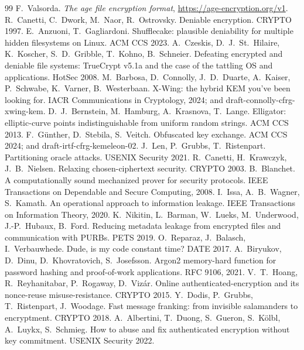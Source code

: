 \documentclass[11pt,a4paper]{article}
\theoremstyle{definition}
\theoremstyle{remark}
\begin{document}
\begin{thebibliography}{99}
 F.~Valsorda. \emph{The age file encryption format}, \url{https://age-encryption.org/v1}.
 R.~Canetti, C.~Dwork, M.~Naor, R.~Ostrovsky. Deniable encryption. CRYPTO 1997.
 E.~Anzuoni, T.~Gagliardoni. Shufflecake: plausible deniability for multiple hidden filesystems on Linux. ACM CCS 2023.
 A.~Czeskis, D.~J.~St.~Hilaire, K.~Koscher, S.~D.~Gribble, T.~Kohno, B.~Schneier. Defeating encrypted and deniable file systems: TrueCrypt v5.1a and the case of the tattling OS and applications. HotSec 2008.
 M.~Barbosa, D.~Connolly, J.~D.~Duarte, A.~Kaiser, P.~Schwabe, K.~Varner, B.~Westerbaan. X-Wing: the hybrid KEM you've been looking for. IACR Communications in Cryptology, 2024; and draft-connolly-cfrg-xwing-kem.
 D.~J.~Bernstein, M.~Hamburg, A.~Krasnova, T.~Lange. Elligator: elliptic-curve points indistinguishable from uniform random strings. ACM CCS 2013.
 F.~G\"unther, D.~Stebila, S.~Veitch. Obfuscated key exchange. ACM CCS 2024; and draft-irtf-cfrg-kemeleon-02.
 J.~Len, P.~Grubbs, T.~Ristenpart. Partitioning oracle attacks. USENIX Security 2021.
 R.~Canetti, H.~Krawczyk, J.~B.~Nielsen. Relaxing chosen-ciphertext security. CRYPTO 2003.
 B.~Blanchet. A computationally sound mechanized prover for security protocols. IEEE Transactions on Dependable and Secure Computing, 2008.
 I.~Issa, A.~B.~Wagner, S.~Kamath. An operational approach to information leakage. IEEE Transactions on Information Theory, 2020.
 K.~Nikitin, L.~Barman, W.~Lueks, M.~Underwood, J.-P.~Hubaux, B.~Ford. Reducing metadata leakage from encrypted files and communication with PURBs. PETS 2019.
 O.~Reparaz, J.~Balasch, I.~Verbauwhede. Dude, is my code constant time? DATE 2017.
 A.~Biryukov, D.~Dinu, D.~Khovratovich, S.~Josefsson. Argon2 memory-hard function for password hashing and proof-of-work applications. RFC 9106, 2021.
 V.~T.~Hoang, R.~Reyhanitabar, P.~Rogaway, D.~Viz\'ar. Online authenticated-encryption and its nonce-reuse misuse-resistance. CRYPTO 2015.
 Y.~Dodis, P.~Grubbs, T.~Ristenpart, J.~Woodage. Fast message franking: from invisible salamanders to encryptment. CRYPTO 2018.
 A.~Albertini, T.~Duong, S.~Gueron, S.~K\"olbl, A.~Luykx, S.~Schmieg. How to abuse and fix authenticated encryption without key commitment. USENIX Security 2022.

\end{thebibliography}
\end{document}
